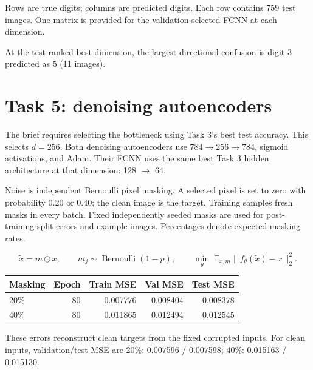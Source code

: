 \documentclass[11pt,a4paper]{article}
\begin{document}
{\small Rows are true digits; columns are predicted digits. Each row contains 759 test images. One matrix is provided for the validation-selected FCNN at each dimension.}\par

At the test-ranked best dimension, the largest directional confusion is digit 3 predicted as 5 (11 images).


\clearpage

\section{Task 5: denoising autoencoders}

The brief requires selecting the bottleneck using Task 3's best test accuracy. This selects $d=256$. Both denoising autoencoders use $784\to256\to784$, sigmoid activations, and Adam. Their FCNN uses the same best Task 3 hidden architecture at that dimension: 128 $\to$ 64.


Noise is independent Bernoulli pixel masking. A selected pixel is set to zero with probability 0.20 or 0.40; the clean image is the target. Training samples fresh masks in every batch. Fixed independently seeded masks are used for post-training split errors and example images. Percentages denote expected masking rates.


\[\tilde{x}=m\odot x,\qquad m_j\sim\operatorname{Bernoulli}(1-p),\qquad \min_\theta\;\mathbb{E}_{x,m}\lVert f_\theta(\tilde{x})-x\rVert_2^2.\]

\begingroup\small\setlength{\tabcolsep}{5pt}

\begin{tabularx}{\linewidth}{Yrrrr}

\toprule

\textbf{Masking} & \textbf{Epoch} & \textbf{Train MSE} & \textbf{Val MSE} & \textbf{Test MSE} \\

\midrule

20\% & 80 & 0.007776 & 0.008404 & 0.008378 \\

40\% & 80 & 0.011865 & 0.012494 & 0.012545 \\

\bottomrule\end{tabularx}\endgroup\par\medskip

These errors reconstruct clean targets from the fixed corrupted inputs. For clean inputs, validation/test MSE are 20\%: 0.007596 / 0.007598; 40\%: 0.015163 / 0.015130.
\end{document}

